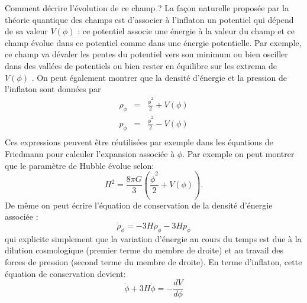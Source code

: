 Comment décrire l'évolution de ce champ ? La façon naturelle proposée par la théorie quantique des champs est d'associer à l'inflaton un potentiel qui dépend de sa valeur $V(\phi)$  : ce potentiel associe une énergie à la valeur du champ et ce champ évolue dans ce potentiel comme dans une énergie potentielle. Par exemple, ce champ va dévaler les pentes du potentiel vers son minimum ou bien osciller dans des vallées de potentiels ou bien rester en équilibre sur les extrema de $V(\phi)$ . On peut également montrer que la densité d'énergie et la pression de l'inflaton sont données par  
\begin{eqnarray}
\rho_\phi&=&\frac{\dot \phi^2}{2}+V(\phi)\\
p_\phi&=&\frac{\dot \phi^2}{2}-V(\phi)\\
\end{eqnarray}
Ces expressions peuvent être réutilisées par exemple dans les équations de Friedmann pour calculer l'expansion associée à $\phi$. Par exemple on peut montrer que le paramètre de Hubble évolue selon:
\begin{equation}
H^2=\frac{8\pi G}{3}\left(\frac{\dot \phi^2}{2}+V(\phi)\right).
\label{e:hubbleinf}
\end{equation}
De même on peut écrire l'équation de conservation de la densité d'énergie associée :
\begin{equation}
\dot \rho_\phi= -3H\rho_\phi-3Hp_\phi
\end{equation}
qui explicite simplement que la variation d'énergie au cours du temps est due à la dilution cosmologique (premier terme du membre de droite) et au travail des forces de pression (second terme du membre de droite). En terme d'inflaton, cette équation de conservation devient:
\begin{equation}
\ddot \phi+ 3H \dot \phi = -\frac{d V}{d\phi}
\end{equation}

